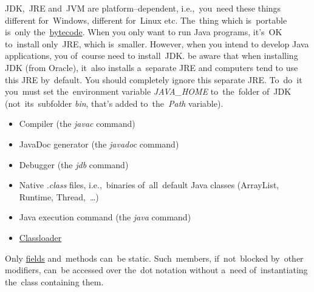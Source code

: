 \noindent JDK,~JRE and~JVM are platform--dependent, i.e.,~you~need these things different for~Windows, different for~Linux etc.
The~thing which is~portable is~only the~\hyperref[bytecode]{bytecode}.
When you only want to run Java programs, it's~OK to~install only~JRE, which is~smaller.
However, when you intend to develop Java applications, you of~course need to install~JDK\@.
be aware that when installing JDK (from Oracle), it~also installs a~separate JRE and computers tend to use this JRE by~default.
You should completely ignore this separate JRE\@.
To~do~it you~must set the~environment variable \textit{JAVA\_HOME} to~the~folder of~JDK (not~its~subfolder \textit{bin}, that's added to~the~\textit{Path} variable).

\begin{itemize}
    \item Compiler (the \textit{javac} command)
    \item JavaDoc generator (the \textit{javadoc} command)
    \item Debugger (the \textit{jdb} command)
\end{itemize}

\begin{itemize}
    \item Native \textit{.class} files, i.e.,~binaries of~all~default Java classes (ArrayList, Runtime, Thread,~\dots)
    \item Java execution command (the \textit{java} command)
    \item \hyperref[classloaders]{Classloader}
\end{itemize}

\label{javadatatypes}

\label{javaaccessmodifiers}

\label{javapublic}

\label{javaprotected}

\label{javaprivate}

\label{javastatic}
Only \hyperref[variablefieldproperty]{fields} and~methods can~be static.
Such~members, if~not~blocked by~other modifiers, can~be accessed over the~dot notation without a~need of~instantiating the~class containing them.

